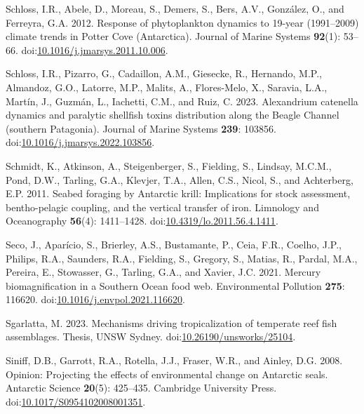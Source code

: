 \documentclass[
]{article}
\newlength{\cslhangindent}
\newenvironment{CSLReferences}[2] %
 {\begin{list}{}{%
  \setlength{\itemindent}{0pt}
  \setlength{\leftmargin}{0pt}
  \setlength{\parsep}{0pt}
  \ifodd #1
   \setlength{\leftmargin}{\cslhangindent}
   \setlength{\itemindent}{-1\cslhangindent}
  \fi
  \setlength{\itemsep}{#2\baselineskip}}}
 {\end{list}}
\begin{document}
\begin{CSLReferences}{1}{0}
Schloss, I.R., Abele, D., Moreau, S., Demers, S., Bers, A.V., González,
O., and Ferreyra, G.A. 2012. Response of phytoplankton dynamics to
19-year (1991--2009) climate trends in {Potter Cove} ({Antarctica}).
Journal of Marine Systems \textbf{92}(1): 53--66.
doi:\href{https://doi.org/10.1016/j.jmarsys.2011.10.006}{10.1016/j.jmarsys.2011.10.006}.

Schloss, I.R., Pizarro, G., Cadaillon, A.M., Giesecke, R., Hernando,
M.P., Almandoz, G.O., Latorre, M.P., Malits, A., Flores-Melo, X.,
Saravia, L.A., Martín, J., Guzmán, L., Iachetti, C.M., and Ruiz, C.
2023. Alexandrium catenella dynamics and paralytic shellfish toxins
distribution along the {Beagle Channel} (southern {Patagonia}). Journal
of Marine Systems \textbf{239}: 103856.
doi:\href{https://doi.org/10.1016/j.jmarsys.2022.103856}{10.1016/j.jmarsys.2022.103856}.

Schmidt, K., Atkinson, A., Steigenberger, S., Fielding, S., Lindsay,
M.C.M., Pond, D.W., Tarling, G.A., Klevjer, T.A., Allen, C.S., Nicol,
S., and Achterberg, E.P. 2011. Seabed foraging by {Antarctic} krill:
{Implications} for stock assessment, bentho-pelagic coupling, and the
vertical transfer of iron. Limnology and Oceanography \textbf{56}(4):
1411--1428.
doi:\href{https://doi.org/10.4319/lo.2011.56.4.1411}{10.4319/lo.2011.56.4.1411}.

Seco, J., Aparício, S., Brierley, A.S., Bustamante, P., Ceia, F.R.,
Coelho, J.P., Philips, R.A., Saunders, R.A., Fielding, S., Gregory, S.,
Matias, R., Pardal, M.A., Pereira, E., Stowasser, G., Tarling, G.A., and
Xavier, J.C. 2021. Mercury biomagnification in a {Southern Ocean} food
web. Environmental Pollution \textbf{275}: 116620.
doi:\href{https://doi.org/10.1016/j.envpol.2021.116620}{10.1016/j.envpol.2021.116620}.

Sgarlatta, M. 2023. Mechanisms driving tropicalization of temperate reef
fish assemblages. Thesis, UNSW Sydney.
doi:\href{https://doi.org/10.26190/unsworks/25104}{10.26190/unsworks/25104}.

Siniff, D.B., Garrott, R.A., Rotella, J.J., Fraser, W.R., and Ainley,
D.G. 2008. Opinion: {Projecting} the effects of environmental change on
{Antarctic} seals. Antarctic Science \textbf{20}(5): 425--435. Cambridge
University Press.
doi:\href{https://doi.org/10.1017/S0954102008001351}{10.1017/S0954102008001351}.


\end{CSLReferences}
\end{document}
